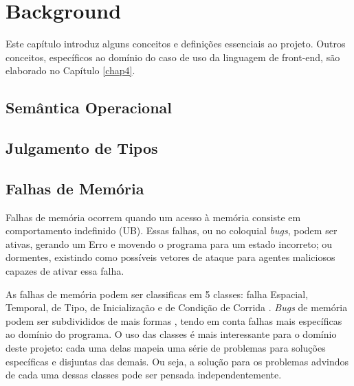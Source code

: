 \chapter{Background}

Este capítulo introduz alguns conceitos e definições essenciais ao projeto. 
Outros conceitos, específicos ao domínio do caso de uso da linguagem de front-end,
são elaborado no Capítulo \ref{chap4}. 

\section{Semântica Operacional}

\section{Julgamento de Tipos}

\section{Falhas de Memória}


Falhas de memória ocorrem quando um acesso à memória consiste em comportamento
indefinido (UB). Essas falhas, ou no coloquial \emph{bugs}, podem ser ativas, 
gerando um Erro e movendo o programa para um estado incorreto; ou dormentes, 
existindo como possíveis vetores de ataque para agentes maliciosos capazes de 
ativar essa falha. 

As falhas de memória podem ser classificas em 5 classes: falha Espacial, 
Temporal, de Tipo, de Inicialização e de Condição de Corrida \cite{Apple22,Google24}.
\emph{Bugs} de memória podem ser subdivididos de mais formas \cite{7KINGDOMS,CWELIST},
tendo em conta falhas mais específicas ao domínio do programa. 
O uso das classes é mais interessante para o domínio deste projeto:
cada uma delas mapeia uma série de problemas para soluções específicas e disjuntas das demais. 
Ou seja, a solução para os problemas advindos de cada uma dessas classes pode ser 
pensada independentemente. 

